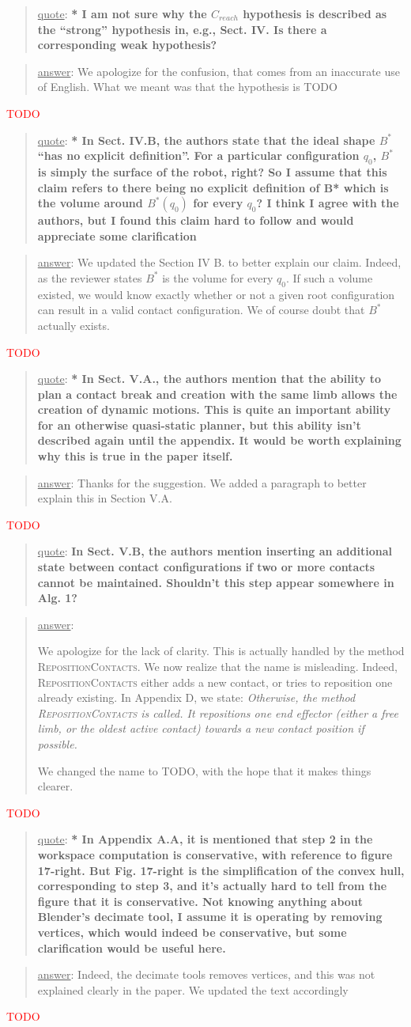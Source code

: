 \documentclass[a4paper]{article}
\newcommand{\ndone}[0]{\textcolor{red}{TODO}}
\newcommand\quot[1]{\begin{quote} \underline{quote}: \textbf{#1}\end{quote}}
\newcommand\as[1]{\begin{quote} \underline{answer}: {#1}\end{quote} }
\begin{document}
\quot{* I am not sure why the $C_{reach}$ hypothesis is described as the ``strong''
hypothesis in, e.g., Sect. IV. Is there a corresponding weak
hypothesis?}
\as{We apologize for the confusion, that comes from an inaccurate use of English. What we meant was that the hypothesis is TODO}\ndone

\quot{* In Sect. IV.B, the authors state that the ideal shape $B^*$ ``has no
explicit definition''. For a particular configuration  $q_0$, $B^*$ is simply
the surface of the robot, right? So I assume that this claim refers to
there being no explicit definition of B* which is the volume around
$B^*(q_0)$ for every $q_0$? I think I agree with the authors, but I found
this claim hard to follow and would appreciate some clarification}
\as{We updated the Section IV B. to better explain our claim. Indeed, as the reviewer states $B^*$  is the volume for every $q_0$. If such a volume existed, we would know exactly whether or not a given root configuration can result in a valid contact configuration.
We of course doubt that $B^*$ actually exists. }\ndone

\quot{* In Sect. V.A., the authors mention that the ability to plan a contact
break and creation with the same limb allows the creation of dynamic
motions. This is quite an important ability for an otherwise
quasi-static planner, but this ability isn't described again until the
appendix. It would be worth explaining why this is true in the paper
itself. }
\as{Thanks for the suggestion. We added a paragraph to better explain this in Section V.A.}\ndone

\quot{In Sect. V.B, the authors mention inserting an additional state
between contact configurations if two or more contacts cannot be
maintained. Shouldn't this step appear somewhere in Alg. 1?}
\as{We apologize for the lack of clarity. This is actually handled by the method \textsc{RepositionContacts}. We now realize that the name is misleading. Indeed,
\textsc{RepositionContacts} either adds a new contact, or tries to reposition one already existing. In Appendix D, we state:
\textit{Otherwise, the method \textsc{RepositionContacts} is called. It repositions one end effector (either a free
limb, or the oldest active contact) towards a new contact
position if possible. }

We changed the name to \textsc{TODO}, with the hope that it makes things clearer.}\ndone

\quot{* In Appendix A.A, it is mentioned that step 2 in the workspace
computation is conservative, with reference to figure 17-right. But
Fig. 17-right is the simplification of the convex hull, corresponding
to step 3, and it's actually hard to tell from the figure that it is
conservative. Not knowing anything about Blender's decimate tool, I
assume it is operating by removing vertices, which would indeed be
conservative, but some clarification would be useful here.}
\as{Indeed, the decimate tools removes vertices, and this was not explained clearly in the paper. We updated the text accordingly}\ndone
\end{document}

